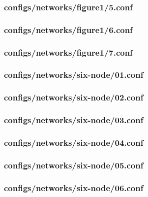 \documentclass[11pt]{article} %
\begin{document}
\subsubsection{configs/networks/figure1/5.conf}


\subsubsection{configs/networks/figure1/6.conf}


\subsubsection{configs/networks/figure1/7.conf} \label{figure1-end}


\subsubsection{configs/networks/six-node/01.conf} \label{six-node-start}


\subsubsection{configs/networks/six-node/02.conf}


\subsubsection{configs/networks/six-node/03.conf}


\subsubsection{configs/networks/six-node/04.conf}


\subsubsection{configs/networks/six-node/05.conf}


\subsubsection{configs/networks/six-node/06.conf} \label{six-node-end}

\end{document}
